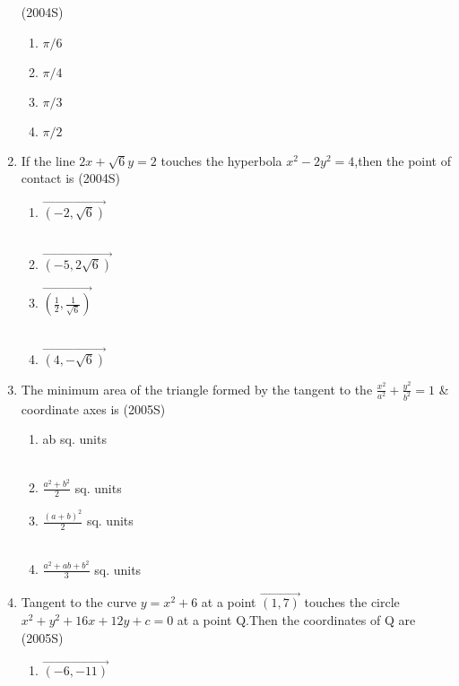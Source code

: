 \documentclass[journal,12pt,twocolumn]{IEEEtran}
\theoremstyle{remark}
\begin{document}
\begin{enumerate}
\hfill{(2004S)}
\begin{multicols}{4}
\begin{enumerate}
    \item $\pi/6$ 
    \item $\pi/4$ 
    \item $\pi/3$
    \item $\pi/2$
\end{enumerate}
\end{multicols}
\item If the line $2x+\sqrt{6}y=2$ touches the hyperbola $x^{2}-2y^{2}=4$,then the point of contact is \hfill{(2004S)}
\begin{multicols}{2}
\begin{enumerate}
    \item $\vec{(-2,\sqrt{6})}$\\\\
    \item $\vec{(-5,2\sqrt{6})}$
    \item $\vec{(\frac{1}{2},\frac{1}{\sqrt{6}})}$\\\\
    \item $\vec{(4,-\sqrt{6})}$
\end{enumerate}
\end{multicols}
\item The minimum area of the triangle formed by the tangent to the $\frac{x^{2}}{a^{2}}+\frac{y^{2}}{b^{2}}=1$ \& coordinate axes is \hfill{(2005S)}
\begin{multicols}{2}
\begin{enumerate}
    \item ab sq. units\\\\
    \item $\frac{a^{2}+b^{2}}{2}$ sq. units
    \item $\frac{(a+b)^{2}}{2}$ sq. units\\\\
    \item $\frac{a^{2}+ab+b^{2}}{3}$ sq. units
\end{enumerate}
\end{multicols}
\item Tangent to the curve $y=x^{2}+6$ at a point $\vec{(1,7)}$ touches the circle $x^{2}+y^{2}+16x+12y+c=0$ at a point Q.Then the coordinates of Q are \hfill{(2005S)}
\begin{multicols}{2}
\begin{enumerate}
    \item$\vec{(-6,-11)}$\\\\

\end{enumerate}
\end{multicols}
\end{enumerate}
\end{document}
